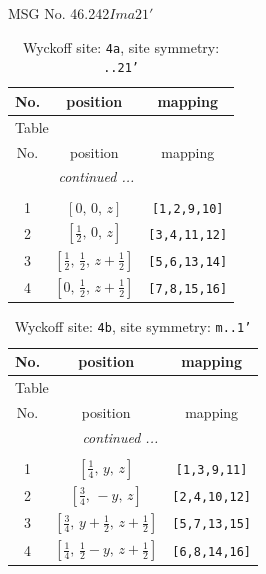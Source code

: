 \documentclass[fleqn,8pt]{jsarticle}
\begin{document}
\setcounter{MaxMatrixCols}{32}

\renewcommand{\tablename}{Table~}
\renewcommand{\figurename}{Figure~}
\begin{center}
\LARGE
MSG No. 46.242\quad$Ima21'$
\end{center}
\renewcommand{\arraystretch}{1.2}
\begin{longtable}{ccc}
\caption{Wyckoff site: {\tt 4a}, site symmetry: {\tt ..21'}}
 \\
 \hline \hline
No. & position & mapping \\ \hline \endfirsthead

\multicolumn{2}{l}{\tablename\ \thetable{}} \\
 \hline \hline
No. & position & mapping \\ \hline \endhead

 \hline \hline
\multicolumn{2}{r}{\footnotesize\it continued ...} \\ \endfoot

 \hline \hline
\multicolumn{2}{r}{} \\ \endlastfoot

1 & $\left[ 0,\, 0,\, z \right]$ & {\tt [1,2,9,10]} \\ \hline
2 & $\left[ \frac{1}{2},\, 0,\, z \right]$ & {\tt [3,4,11,12]} \\ \hline
3 & $\left[ \frac{1}{2},\, \frac{1}{2},\, z + \frac{1}{2} \right]$ & {\tt [5,6,13,14]} \\ \hline
4 & $\left[ 0,\, \frac{1}{2},\, z + \frac{1}{2} \right]$ & {\tt [7,8,15,16]} \\
\end{longtable}
\renewcommand{\arraystretch}{1.2}
\begin{longtable}{ccc}
\caption{Wyckoff site: {\tt 4b}, site symmetry: {\tt m..1'}}
 \\
 \hline \hline
No. & position & mapping \\ \hline \endfirsthead

\multicolumn{2}{l}{\tablename\ \thetable{}} \\
 \hline \hline
No. & position & mapping \\ \hline \endhead

 \hline \hline
\multicolumn{2}{r}{\footnotesize\it continued ...} \\ \endfoot

 \hline \hline
\multicolumn{2}{r}{} \\ \endlastfoot

1 & $\left[ \frac{1}{4},\, y,\, z \right]$ & {\tt [1,3,9,11]} \\ \hline
2 & $\left[ \frac{3}{4},\, - y,\, z \right]$ & {\tt [2,4,10,12]} \\ \hline
3 & $\left[ \frac{3}{4},\, y + \frac{1}{2},\, z + \frac{1}{2} \right]$ & {\tt [5,7,13,15]} \\ \hline
4 & $\left[ \frac{1}{4},\, \frac{1}{2} - y,\, z + \frac{1}{2} \right]$ & {\tt [6,8,14,16]} \\
\end{longtable}
\end{document}
